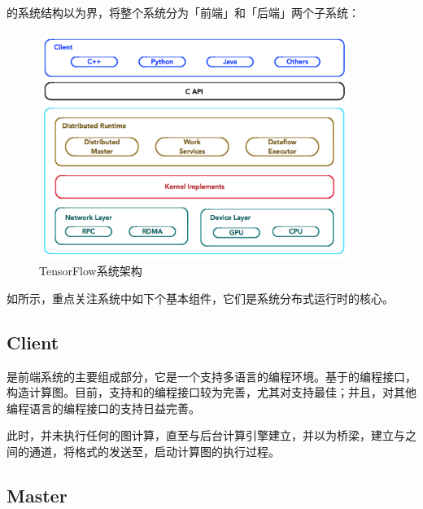 \begin{content}

\tf{}的系统结构以为界，将整个系统分为「前端」和「后端」两个子系统：

\begin{enum}
\end{enum}

\begin{figure}[!htbp]
\centering
\includegraphics[width=0.9\textwidth]{figures/tf-architecture.png}
\caption{TensorFlow系统架构}
 \label{fig:tf-architecture}
\end{figure}

如所示，重点关注系统中如下个基本组件，它们是系统分布式运行时的核心。

\subsection{Client}

是前端系统的主要组成部分，它是一个支持多语言的编程环境。基于的编程接口，构造计算图。目前，支持和的编程接口较为完善，尤其对支持最佳；并且，对其他编程语言的编程接口的支持日益完善。

此时，并未执行任何的图计算，直至与后台计算引擎建立，并以为桥梁，建立与之间的通道，将格式的发送至，启动计算图的执行过程。

\subsection{Master}


\end{content}
